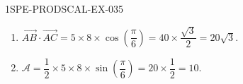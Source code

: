 \begin{corrige}{1SPE-PRODSCAL-EX-035}
\begin{enumerate}
\item $\overrightarrow{AB} \cdot \overrightarrow{AC} = 5 \times 8 \times \cos\!\left(\dfrac{\pi}{6}\right) = 40 \times \dfrac{\sqrt{3}}{2} = 20\sqrt{3}$.
\item $\mathcal{A} = \dfrac{1}{2} \times 5 \times 8 \times \sin\!\left(\dfrac{\pi}{6}\right) = 20 \times \dfrac{1}{2} = 10$.
\end{enumerate}
\end{corrige}
